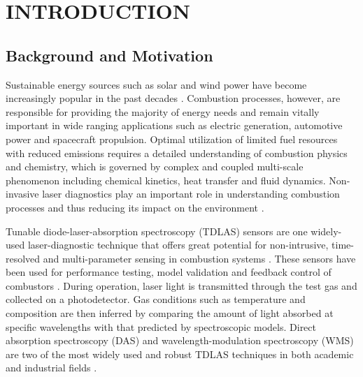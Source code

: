 \chapter{INTRODUCTION}
\vspace{5mm}
\section{Background and Motivation}
\noindent
Sustainable energy sources such as solar and wind power have become increasingly popular in the past decades \cite{Kiefer}. Combustion processes, however, are responsible for providing the majority of energy needs and remain vitally important in wide ranging applications such as electric generation, automotive power and spacecraft propulsion. Optimal utilization of limited fuel resources with reduced emissions requires a detailed understanding of combustion physics and chemistry, which is governed by complex and coupled multi-scale phenomenon including chemical kinetics, heat transfer and fluid dynamics. Non-invasive laser diagnostics play an important role in understanding combustion processes and thus reducing its impact on the environment \cite{Goldenstein2017, HANSON20111, Chang2018,  WOLFRUM19981,Allen1998, WERLE1998197, Lackner2007, Schulz2007, BOLSHOV201545, Eckbreth, Kohse, hanson2016spectroscopy}. 

Tunable diode-laser-absorption spectroscopy (TDLAS) sensors are one widely-used laser-diagnostic technique that offers great potential for non-intrusive, time-resolved and multi-parameter sensing in combustion systems \cite{Goldenstein2017}. These sensors have been used for performance testing, model validation and feedback control of combustors \cite{Goldenstein2017,Ma2013,Caswell2013,Stritzke2015,Witzel2013,Whitney2011,Makowiecki2017,Rieker2009b,Li2011}. During operation, laser light is transmitted through the test gas and collected on a photodetector. Gas conditions such as temperature and composition are then inferred by comparing the amount of light absorbed at specific wavelengths with that predicted by spectroscopic models. Direct absorption spectroscopy (DAS) and wavelength-modulation spectroscopy (WMS) are two of the most widely used and robust TDLAS techniques in both academic and industrial fields \cite{Lackner2007}.
 
